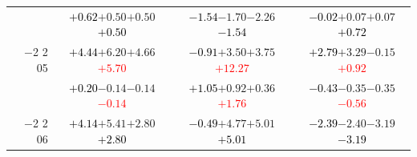 \documentclass[compress]{beamer}
\begin{document}
\begin{frame}
\begin{tabular}{r | c | c | c}
          & \textcolor{black}{$+0.62$}\hspace{0.1 cm}$+0.50$\hspace{0.1 cm}$+0.50$\hspace{0.1 cm}\textcolor{black}{$+0.50$} & \textcolor{black}{$-1.54$}\hspace{0.1 cm}$-1.70$\hspace{0.1 cm}$-2.26$\hspace{0.1 cm}\textcolor{black}{$-1.54$} & \textcolor{black}{$-0.02$}\hspace{0.1 cm}$+0.07$\hspace{0.1 cm}$+0.07$\hspace{0.1 cm}\textcolor{black}{$+0.72$} \\
$-$2 2 05 & \textcolor{black}{$+4.44$}\hspace{0.1 cm}$+6.20$\hspace{0.1 cm}$+4.66$\hspace{0.1 cm}\textcolor{red}{$+5.70$} & \textcolor{black}{$-0.91$}\hspace{0.1 cm}$+3.50$\hspace{0.1 cm}$+3.75$\hspace{0.1 cm}\textcolor{red}{$+12.27$} & \textcolor{black}{$+2.79$}\hspace{0.1 cm}$+3.29$\hspace{0.1 cm}$-0.15$\hspace{0.1 cm}\textcolor{red}{$+0.92$} \\
          & \textcolor{black}{$+0.20$}\hspace{0.1 cm}$-0.14$\hspace{0.1 cm}$-0.14$\hspace{0.1 cm}\textcolor{red}{$-0.14$} & \textcolor{black}{$+1.05$}\hspace{0.1 cm}$+0.92$\hspace{0.1 cm}$+0.36$\hspace{0.1 cm}\textcolor{red}{$+1.76$} & \textcolor{black}{$-0.43$}\hspace{0.1 cm}$-0.35$\hspace{0.1 cm}$-0.35$\hspace{0.1 cm}\textcolor{red}{$-0.56$} \\
$-$2 2 06 & \textcolor{black}{$+4.14$}\hspace{0.1 cm}$+5.41$\hspace{0.1 cm}$+2.80$\hspace{0.1 cm}\textcolor{black}{$+2.80$} & \textcolor{black}{$-0.49$}\hspace{0.1 cm}$+4.77$\hspace{0.1 cm}$+5.01$\hspace{0.1 cm}\textcolor{black}{$+5.01$} & \textcolor{black}{$-2.39$}\hspace{0.1 cm}$-2.40$\hspace{0.1 cm}$-3.19$\hspace{0.1 cm}\textcolor{black}{$-3.19$} \\

\end{tabular}
\end{frame}
\end{document}
